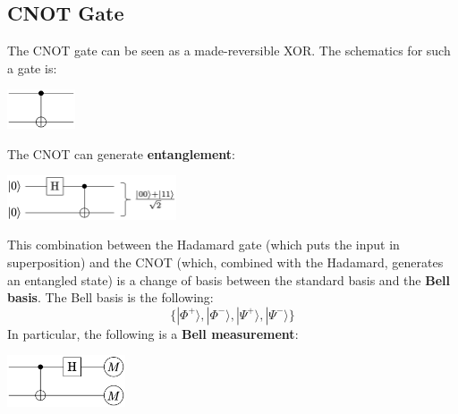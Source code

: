 \documentclass{article}
\begin{document}
\subsection{CNOT Gate}
The CNOT gate can be seen as a made-reversible XOR. The schematics for such a gate is:
\begin{center}
	\includegraphics[width=2cm]{assets/cnot.png}
\end{center}
The CNOT can generate \textbf{entanglement}:
\begin{center}
	\includegraphics[width=5cm]{assets/entanglement.png}
\end{center}
This combination between the Hadamard gate (which puts the input in superposition) and the CNOT (which, combined with the Hadamard, generates an entangled state) is a change of basis between the standard basis and the \textbf{Bell basis}. The Bell basis is the following:
\[ \{ |\Phi^+\rangle, |\Phi^-\rangle, |\Psi^+\rangle, |\Psi^-\rangle \} \]
In particular, the following is a \textbf{Bell measurement}:
\begin{center}
	\includegraphics[width=3.5cm]{assets/bell_measurement.png}
\end{center}
\end{document}
